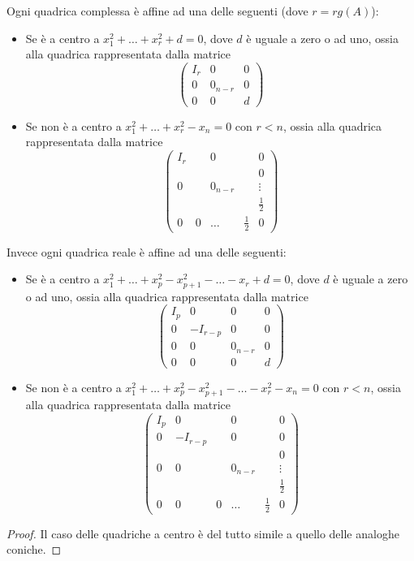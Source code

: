  \begin{theorem}
 Ogni quadrica complessa è affine ad una delle seguenti (dove $r=rg(A)$):
 \begin{itemize}
  \item Se è a centro a $x_1^2+\ldots+x_r^2+d=0$, dove $d$ è uguale a zero o ad uno, ossia alla quadrica rappresentata dalla matrice
  $$\left( \begin{array}{cc|c}
   I_r & 0 & 0\\
   0 & 0_{n-r} & 0\\
   \hline
   0 & 0 & d
  \end{array} \right)$$
  \item Se non è a centro a $x_1^2+\ldots+x_r^2-x_n=0$ con $r<n$, ossia alla quadrica rappresentata dalla matrice
  $$\left( \begin{array}{cccc|c}
   I_r & & 0 & & 0\\
   & & & & 0\\
   0 & & 0_{n-r} & & \vdots\\
   & & & & \frac{1}{2}\\
   \hline
   0 & 0 &\dots & \frac{1}{2} & 0
  \end{array} \right)$$
 \end{itemize}
 Invece ogni quadrica reale è affine ad una delle seguenti:
 \begin{itemize}
  \item Se è a centro a $x_1^2+\ldots+x_p^2-x_{p+1}^2-\ldots-x_r+d=0$, dove $d$ è uguale a zero o ad uno, ossia alla quadrica
  rappresentata dalla matrice $$\left( \begin{array}{ccc|c}
   I_p & 0 & 0 & 0 \\
   0 & -I_{r-p} & 0 & 0\\
   0 & 0 & 0_{n-r} & 0 \\
   \hline
   0 & 0 & 0 & d
  \end{array} \right)$$
  \item Se non è a centro a $x_1^2+\ldots+x_p^2-x_{p+1}^2-\ldots-x_r^2-x_n=0$ con $r<n$, ossia alla quadrica rappresentata dalla matrice
  $$\left( \begin{array}{ccccc|c}
   I_p & 0 & & 0 & & 0\\
   0 & -I_{r-p} & & 0 & & 0 \\
   & & & & & 0\\
   0 & 0 & & 0_{n-r} & & \vdots\\
   & & & & & \frac{1}{2}\\
   \hline
   0 & 0 & 0 &\dots & \frac{1}{2} & 0
  \end{array} \right)$$
 \end{itemize}
 \end{theorem}
 \begin{proof}
  Il caso delle quadriche a centro è del tutto simile a quello delle analoghe coniche.
 \end{proof}

